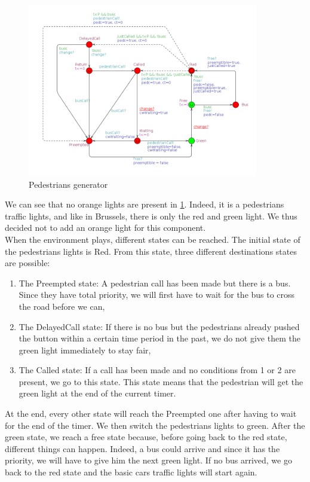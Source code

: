 \begin{figure}[H]\label{fig:crosswalk}
  \centering
    \includegraphics[width=0.9\textwidth]{picture/crosswalk.png}
    \caption{Pedestrians generator}
\end{figure}
\noindent We can see that no orange lights are present in \ref{fig:crosswalk}. Indeed, it is a pedestrians traffic lights, and like in Brussels, there is only the red and green light. We thus decided not to add an orange light for this component. \\
When the environment plays, different states can be reached. The initial state of the pedestrians lights is Red. From this state, three different destinations states are possible:
\begin{enumerate}
  \item The Preempted state: A pedestrian call has been made but there is a bus. Since they have total priority, we will first have to wait for the bus to cross the road before we can,
  \item The DelayedCall state: If there is no bus but the pedestrians already pushed the button within a certain time period in the past, we do not give them the green light immediately to stay fair,
  \item The Called state: If a call has been made and no conditions from 1 or 2 are present, we go to this state. This state means that the pedestrian will get the green light at the end of the current timer.
\end{enumerate}
At the end, every other state will reach the Preempted one after having to wait for the end of the timer. We then switch the pedestrians lights to green. After the green state, we reach a free state because, before going back to the red state, different things can happen. Indeed, a bus could arrive and since it has the priority, we will have to give him the next green light. If no bus arrived, we go back to the red state and the basic cars traffic lights will start again. 

